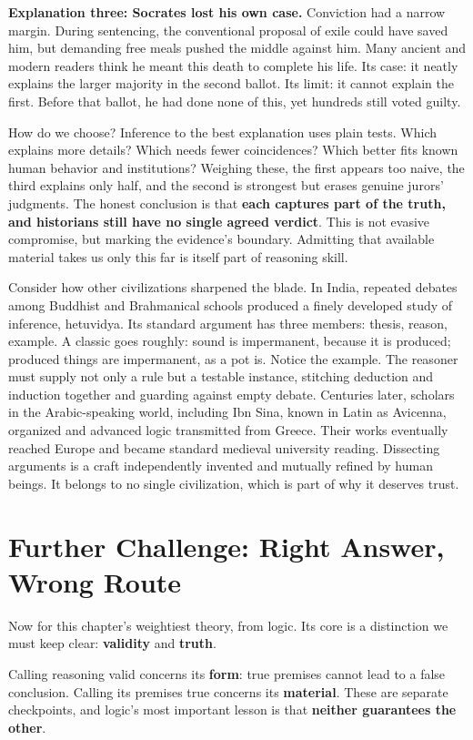 \textbf{Explanation three: Socrates lost his own case.} Conviction had a narrow margin. During sentencing, the conventional proposal of exile could have saved him, but demanding free meals pushed the middle against him. Many ancient and modern readers think he meant this death to complete his life. Its case: it neatly explains the larger majority in the second ballot. Its limit: it cannot explain the first. Before that ballot, he had done none of this, yet hundreds still voted guilty.

How do we choose? Inference to the best explanation uses plain tests. Which explains more details? Which needs fewer coincidences? Which better fits known human behavior and institutions? Weighing these, the first appears too naive, the third explains only half, and the second is strongest but erases genuine jurors' judgments. The honest conclusion is that \textbf{each captures part of the truth, and historians still have no single agreed verdict}. This is not evasive compromise, but marking the evidence's boundary. Admitting that available material takes us only this far is itself part of reasoning skill.

Consider how other civilizations sharpened the blade. In India, repeated debates among Buddhist and Brahmanical schools produced a finely developed study of inference, hetuvidya. Its standard argument has three members: thesis, reason, example. A classic goes roughly: sound is impermanent, because it is produced; produced things are impermanent, as a pot is. Notice the example. The reasoner must supply not only a rule but a testable instance, stitching deduction and induction together and guarding against empty debate. Centuries later, scholars in the Arabic-speaking world, including Ibn Sina, known in Latin as Avicenna, organized and advanced logic transmitted from Greece. Their works eventually reached Europe and became standard medieval university reading. Dissecting arguments is a craft independently invented and mutually refined by human beings. It belongs to no single civilization, which is part of why it deserves trust.

\section{Further Challenge: Right Answer, Wrong Route}
Now for this chapter's weightiest theory, from logic. Its core is a distinction we must keep clear: \textbf{validity} and \textbf{truth}.

Calling reasoning valid concerns its \textbf{form}: true premises cannot lead to a false conclusion. Calling its premises true concerns its \textbf{material}. These are separate checkpoints, and logic's most important lesson is that \textbf{neither guarantees the other}.

